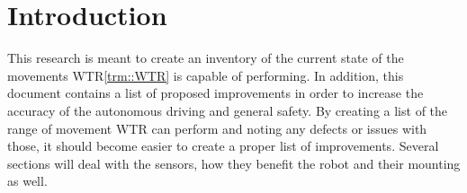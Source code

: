 \section{Introduction}
This research is meant to create an inventory of the current state of the movements WTR\ref{trm::WTR} is capable of performing.
In addition, this document contains a list of proposed improvements in order to increase the accuracy of the autonomous driving and general safety.
By creating a list of the range of movement WTR can perform and noting any defects or issues with those, it should become easier to create a proper list of improvements.
Several sections will deal with the sensors, how they benefit the robot and their mounting as well.
\newpage
